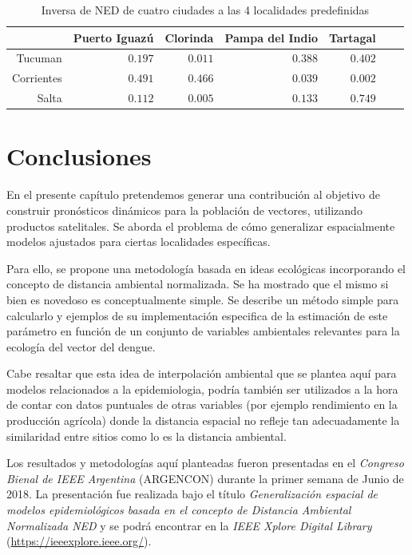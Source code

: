     \begin{table}[hbt]
    \centering
    \caption{Inversa de NED de cuatro ciudades a las 4 localidades predefinidas}\label{Tab:comparacion_ned}
    \begin{tabular}{*7{r}}
    \toprule
    & Puerto Iguazú
    & Clorinda
    & Pampa del Indio
    & Tartagal \\ \midrule
    Tucuman
    &$0.197$
    &$0.011$
    &$0.388$%
    &$0.402$\\
    Corrientes
    &$0.491$
    &$0.466$
    &$0.039$
    &$0.002$ \\
    Salta
    &$0.112$
    &$0.005$
    &$0.133$   %
    &$0.749$ \\
    \bottomrule
    \end{tabular}
    \end{table}

\section{Conclusiones}
  \par En el presente capítulo pretendemos generar una contribución al objetivo de
    construir pronósticos dinámicos para la población de vectores,
    utilizando productos satelitales. Se aborda el problema de cómo generalizar
    espacialmente modelos ajustados para ciertas localidades específicas.

  \par Para ello, se propone una metodología basada en ideas ecológicas
    incorporando el concepto de distancia ambiental normalizada.
    Se ha mostrado que el mismo si bien es novedoso es conceptualmente simple.
    Se describe un método simple para calcularlo y ejemplos de su
    implementación especifica de la estimación de este parámetro en
    función de un conjunto de variables ambientales relevantes para la
    ecología del vector del dengue.

  \par Cabe resaltar que esta idea de interpolación ambiental que se
    plantea aquí para modelos relacionados a la epidemiologia,
    podría también ser utilizados a la hora de contar con datos
    puntuales de otras variables (por ejemplo rendimiento en la producción
    agrícola) donde la distancia espacial no refleje tan adecuadamente la
    similaridad entre sitios como lo es la distancia ambiental.


  \par Los resultados y metodologías aquí planteadas fueron presentadas en el
    \textit{Congreso Bienal de IEEE Argentina} (ARGENCON) durante la primer semana de Junio
    de 2018. La presentación fue realizada bajo el título
    \textit{Generalización espacial de modelos epidemiológicos basada en el
    concepto de Distancia Ambiental Normalizada NED} y
    se podrá encontrar
    en la \textit{IEEE Xplore Digital Library} (\url{https://ieeexplore.ieee.org/}).
%
